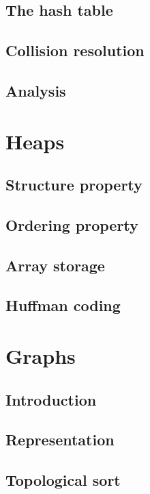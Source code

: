 \documentclass[11pt,twoside]{book}
\begin{document}
\section{The hash table}

\section{Collision resolution}

\section{Analysis}


\chapter{Heaps}

\section{Structure property}

\section{Ordering property}

\section{Array storage}

\section{Huffman coding}

\chapter{Graphs}

\section{Introduction}

\section{Representation}

\section{Topological sort}
\end{document}
